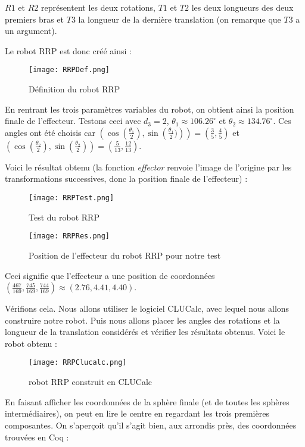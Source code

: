 $R1$ et $R2$ représentent les deux rotations, $T1$ et $T2$ les deux longueurs des deux premiers bras et $T3$ la longueur de la dernière translation (on remarque que $T3$ a un argument).

Le robot RRP est donc créé ainsi : 

\begin{figure}[!ht]
\centering
\texttt{[image: RRPDef.png]}
\caption{Définition du robot RRP}
\end{figure}

En rentrant les trois paramètres variables du robot, on obtient ainsi la position finale de l'effecteur. Testons ceci avec $d_3= 2$, $\theta_1 \approx 106.26 ^{\circ}$ et $\theta_2 \approx 134.76 ^{\circ}$. Ces angles ont été choisis car $\left(\cos \left(\frac{\theta_1}{2} \right), \sin \left(\frac{\theta_1}{2}) \right) \right) = \left(\frac{3}{5}, \frac{4}{5} \right) $ et $\left(\cos \left(\frac{\theta_2}{2} \right), \sin \left(\frac{\theta_2}{2} \right) \right) = \left(\frac{5}{13}, \frac{12}{13} \right) $. 

Voici le résultat obtenu (la fonction \textit{effector} renvoie l'image de l'origine par les transformations successives, donc la position finale de l'effecteur) : 

\begin{figure}[!ht]
\centering
\texttt{[image: RRPTest.png]}

\caption{Test du robot RRP}
\end{figure}


\begin{figure}[!ht]
\centering
\texttt{[image: RRPRes.png]}
\caption{Position de l'effecteur du robot RRP pour notre test}
\end{figure}

Ceci signifie que l'effecteur a une position de coordonnées $\left( \frac{467}{169}, \frac{745}{169}, \frac{744}{169}  \right) \approx (2.76, 4.41, 4.40)$.

Vérifions cela. Nous allons utiliser le logiciel CLUCalc, avec lequel nous allons construire notre robot. Puis nous allons placer les angles des rotations et la longueur de la translation considérés et vérifier les résultats obtenus. Voici le robot obtenu : 
\newpage
\begin{figure}[!ht]
\centering
\texttt{[image: RRPClucalc.png]}
\caption{robot RRP construit en CLUCalc}
\end{figure}


En faisant afficher les coordonnées de la sphère finale (et de toutes les sphères intermédiaires), on peut en lire le centre en regardant les trois premières composantes. On s'aperçoit qu'il s'agit bien, aux arrondis près, des coordonnées trouvées en Coq : 

